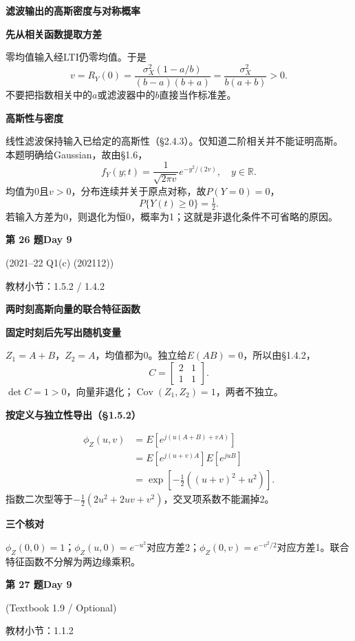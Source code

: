 \documentclass[10.5pt,fontset=fandol]{ctexart}
\newcommand{\key}[1]{\par\vspace{4pt}\noindent\textbf{\color{navy}#1}\par\vspace{2pt}}
\newcommand{\qtitle}[2]{\par\addvspace{1.2em}\Needspace{8\baselineskip}\begin{tcolorbox}[colback=navy,colframe=navy,arc=1.5pt,boxrule=0pt]\color{white}\large\bfseries #1\hfill\small #2\end{tcolorbox}}
\begin{document}
\noindent\textbf{滤波输出的高斯密度与对称概率}\par\smallskip\begin{tcolorbox}[breakable,colback=qbg,colframe=qbg,boxrule=0pt]\key{先从相关函数提取方差}
零均值输入经LTI仍零均值。于是
\[v=R_Y(0)=\frac{\sigma_X^2(1-a/b)}{(b-a)(b+a)}=\boxed{\frac{\sigma_X^2}{b(a+b)}}>0.\]
不要把指数相关中的$a$或滤波器中的$b$直接当作标准差。
\key{高斯性与密度}
线性滤波保持输入已给定的高斯性（§2.4.3）。仅知道二阶相关并不能证明高斯。本题明确给Gaussian，故由§1.6，
\[\boxed{f_Y(y;t)=\frac{1}{\sqrt{2\pi v}}e^{-y^2/(2v)},\quad y\in\mathbb R.}\]
均值为0且$v>0$，分布连续并关于原点对称，故$P(Y=0)=0$，
\[\boxed{P\{Y(t)\ge0\}=\tfrac12}.\]
若输入方差为0，则退化为恒0，概率为1；这就是非退化条件不可省略的原因。
\end{tcolorbox}
\qtitle{第 26 题}{Day 9}
{\small\color{accentred}(2021--22 Q1(c) (202112))}\par\smallskip
{\small\color{muted}教材小节：1.5.2 / 1.4.2}\par\medskip
\noindent\textbf{两时刻高斯向量的联合特征函数}\par\smallskip\begin{tcolorbox}[breakable,colback=qbg,colframe=qbg,boxrule=0pt]\key{固定时刻后先写出随机变量}
$Z_1=A+B$，$Z_2=A$，均值都为0。独立给$E(AB)=0$，所以由§1.4.2，
\[\boxed{C=\begin{bmatrix}2&1\\1&1\end{bmatrix}}.\]
$\det C=1>0$，向量非退化；$\operatorname{Cov}(Z_1,Z_2)=1$，两者不独立。
\key{按定义与独立性导出（§1.5.2）}
\[\begin{aligned}\phi_Z(u,v)&=E[e^{j(u(A+B)+vA)}]\\&=E[e^{j(u+v)A}]E[e^{juB}]\\&=\boxed{\exp[-\tfrac12((u+v)^2+u^2)]}.\end{aligned}\]
指数二次型等于$-\tfrac12(2u^2+2uv+v^2)$，交叉项系数不能漏掉2。
\key{三个核对}
$\phi_Z(0,0)=1$；$\phi_Z(u,0)=e^{-u^2}$对应方差2；$\phi_Z(0,v)=e^{-v^2/2}$对应方差1。联合特征函数不分解为两边缘乘积。
\end{tcolorbox}
\qtitle{第 27 题}{Day 9}
{\small\color{accentred}(Textbook 1.9 / Optional)}\par\smallskip
{\small\color{muted}教材小节：1.1.2}\par\medskip
\end{document}
